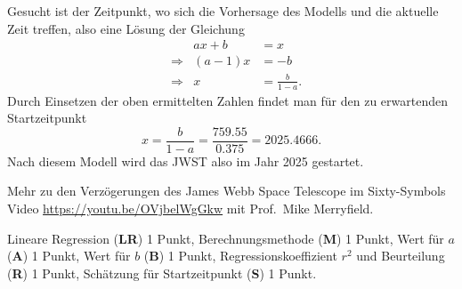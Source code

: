 \begin{loesung}
\begin{teilaufgaben}
Gesucht ist der Zeitpunkt, wo sich die Vorhersage des Modells und die
aktuelle Zeit treffen, also eine Lösung der Gleichung
\[
\begin{aligned}
&&ax+b&=x
\\
&\Rightarrow&(a-1)x&=-b
\\
&\Rightarrow& x&=\frac{b}{1-a}.
\end{aligned}
\]
Durch Einsetzen der oben ermittelten Zahlen findet man für den zu
erwartenden Startzeitpunkt
\[
x
=
\frac{b}{1-a}
=
\frac{759.55}{0.375}
=
2025.4666.
\]
Nach diesem Modell wird das JWST also im Jahr 2025 gestartet.
\qedhere
\end{teilaufgaben}
\end{loesung}

\begin{diskussion}Mehr zu den Verzögerungen des
James Webb Space Telescope im Sixty-Symbols Video
\url{https://youtu.be/OVjbelWgGkw} mit Prof.~Mike Merryfield.
\end{diskussion}

\begin{bewertung}
Lineare Regression ({\bf LR}) 1 Punkt,
Berechnungsmethode ({\bf M}) 1 Punkt,
Wert für $a$ ({\bf A}) 1 Punkt,
Wert für $b$ ({\bf B}) 1 Punkt,
Regressionskoeffizient $r^2$ und Beurteilung ({\bf R}) 1 Punkt,
Schätzung für Startzeitpunkt ({\bf S}) 1 Punkt.
\end{bewertung}

%
%
%
%
%
%
%
%
%
%
%
%
